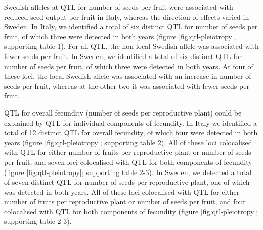 \documentclass[]{article}
\begin{document}
Swedish alleles at QTL for number of seeds per fruit were associated with reduced seed output per fruit in Italy, whereas the direction of effects varied in Sweden.
In Italy, we identified a total of six distinct QTL for number of seeds per fruit, of which three were detected in both years (figure \ref{fig:qtl-pleiotropy}, supporting table 1).
For all QTL, the non-local Swedish allele was associated with fewer seeds per fruit.
In Sweden, we identified a total of six distinct QTL for number of seeds per fruit, of which three were detected in both years.
At four of these loci, the local Swedish allele was associated with an increase in number of seeds per fruit, whereas at the other two it was associated with fewer seeds per fruit.

QTL for overall fecundity (number of seeds per reproductive plant) could be explained by QTL for individual components of fecundity.
In Italy we identified a total of 12 distinct QTL for overall fecundity, of which four were detected in both years (figure \ref{fig:qtl-pleiotropy}; supporting table 2).
All of these loci colocalised with QTL for either number of fruits per reproductive plant or number of seeds per fruit, and seven loci colocalised with QTL for both components of fecundity (figure \ref{fig:qtl-pleiotropy}; supporting table 2-3).
In Sweden, we detected a total of seven distinct QTL for number of seeds per reproductive plant, one of which was detected in both years.
All of these loci colocalised with QTL for either number of fruits per reproductive plant or number of seeds per fruit, and four colocalised with QTL for both components of fecundity (figure \ref{fig:qtl-pleiotropy}; supporting table 2-3).
\end{document}

